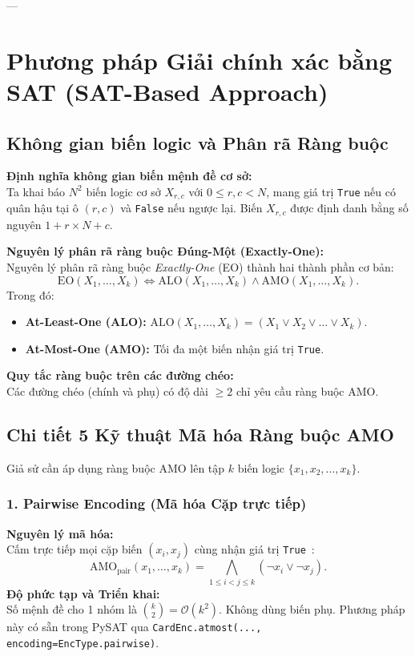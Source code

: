 \documentclass[a4paper,fleqn]{cas-sc}
\begin{document}
---

\section{Phương pháp Giải chính xác bằng SAT (SAT-Based Approach)}

\subsection{Không gian biến logic và Phân rã Ràng buộc}

\noindent\textbf{Định nghĩa không gian biến mệnh đề cơ sở:}\\
Ta khai báo $N^2$ biến logic cơ sở $X_{r,c}$ với $0 \le r, c < N$, mang giá trị \texttt{True} nếu có quân hậu tại ô $(r, c)$ và \texttt{False} nếu ngược lại. Biến $X_{r,c}$ được định danh bằng số nguyên $1 + r \times N + c$.

\noindent\textbf{Nguyên lý phân rã ràng buộc Đúng-Một (Exactly-One):}\\
Nguyên lý phân rã ràng buộc \textit{Exactly-One} (EO) thành hai thành phần cơ bản:
\begin{equation}
    \text{EO}(X_1, \dots, X_k) \iff \text{ALO}(X_1, \dots, X_k) \land \text{AMO}(X_1, \dots, X_k).
\end{equation}
Trong đó:
\begin{itemize}
    \item \textbf{At-Least-One (ALO):} $\text{ALO}(X_1, \dots, X_k) = (X_1 \lor X_2 \lor \dots \lor X_k)$.
    \item \textbf{At-Most-One (AMO):} Tối đa một biến nhận giá trị \texttt{True}.
\end{itemize}

\noindent\textbf{Quy tắc ràng buộc trên các đường chéo:}\\
Các đường chéo (chính và phụ) có độ dài $\ge 2$ chỉ yêu cầu ràng buộc AMO.

\subsection{Chi tiết 5 Kỹ thuật Mã hóa Ràng buộc AMO}
Giả sử cần áp dụng ràng buộc AMO lên tập $k$ biến logic $\{x_1, x_2, \dots, x_k\}$.

\subsubsection{1. Pairwise Encoding (Mã hóa Cặp trực tiếp)}
\textbf{Nguyên lý mã hóa:}\\
Cấm trực tiếp mọi cặp biến $(x_i, x_j)$ cùng nhận giá trị \texttt{True}~\cite{prestwich2009cnf}:
\begin{equation}
    \text{AMO}_{\text{pair}}(x_1, \dots, x_k) = \bigwedge_{1 \le i < j \le k} (\neg x_i \lor \neg x_j).
\end{equation}
\textbf{Độ phức tạp và Triển khai:}\\
Số mệnh đề cho 1 nhóm là $\binom{k}{2} = \mathcal{O}(k^2)$. Không dùng biến phụ. Phương pháp này có sẵn trong PySAT qua \texttt{CardEnc.atmost(..., encoding=EncType.pairwise)}.
\end{document}
